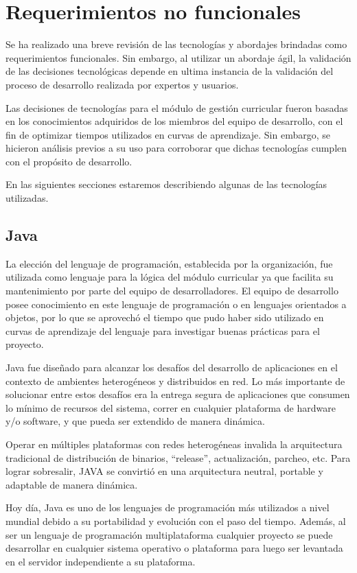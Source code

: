 \section{Requerimientos no funcionales} \label{reqnofuncional}
Se ha realizado una breve revisión de las tecnologías y abordajes brindadas como requerimientos funcionales. Sin embargo, al utilizar un abordaje ágil, la validación de las decisiones tecnológicas depende en ultima instancia de la validación del proceso de desarrollo realizada por expertos y usuarios.

Las decisiones de tecnologías para el módulo de gestión curricular fueron basadas en los conocimientos adquiridos de los miembros del equipo de desarrollo, con el fin de optimizar tiempos utilizados en curvas de aprendizaje. Sin embargo, se hicieron análisis previos a su uso para corroborar que dichas tecnologías cumplen con el propósito de desarrollo.

En las siguientes secciones estaremos describiendo algunas de las tecnologías utilizadas.

\subsection{Java}
La elección del lenguaje de programación, establecida por la organización, fue utilizada como lenguaje para la lógica del módulo curricular ya que facilita su mantenimiento por parte del equipo de desarrolladores. El equipo de desarrollo posee conocimiento en este lenguaje de programación o en lenguajes orientados a objetos, por lo que se aprovechó el tiempo que pudo haber sido utilizado en curvas de aprendizaje del lenguaje para investigar buenas prácticas para el proyecto.

Java fue diseñado para alcanzar los desafíos del desarrollo de aplicaciones en el contexto de ambientes heterogéneos y distribuidos en red. Lo más importante de solucionar entre estos desafíos era la entrega segura de aplicaciones que consumen lo mínimo de recursos del sistema, correr en cualquier plataforma de hardware y/o software, y que pueda ser extendido de manera dinámica.

Operar en múltiples plataformas con redes heterogéneas invalida la arquitectura tradicional de distribución de binarios, \enquote{release}, actualización, parcheo, etc. Para lograr sobresalir, JAVA se convirtió en una arquitectura neutral, portable y adaptable de manera dinámica.

Hoy día, Java es uno de los lenguajes de programación más utilizados a nivel mundial debido a su portabilidad y evolución con el paso del tiempo. Además, al ser un lenguaje de programación multiplataforma cualquier proyecto se puede desarrollar en cualquier sistema operativo o plataforma para luego ser levantada en el servidor independiente a su plataforma. 

